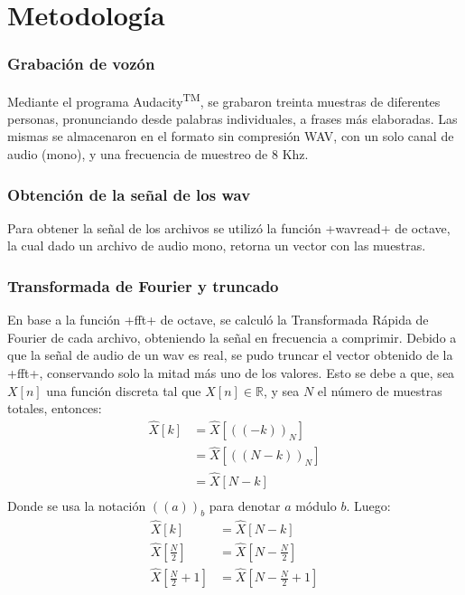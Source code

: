 \documentclass[a4paper,11pt]{article}
\begin{document}
\section{Metodolog\'ia}

\subsubsection{Grabación de voz\'on}
Mediante el programa Audacity\textsuperscript{TM}, se grabaron treinta muestras
de diferentes personas, pronunciando desde palabras individuales, a frases más
elaboradas. Las mismas se almacenaron en el formato sin compresión WAV, con un
solo canal de audio (mono), y una frecuencia de muestreo de $8$ Khz.
\subsubsection{Obtención de la señal de los wav}
Para obtener la señal de los archivos se utilizó la función \verbatim+wavread+ de octave,
la cual dado un archivo de audio mono, retorna un vector con las muestras.
\subsubsection{Transformada de Fourier y truncado}
En base a la función \verbatim+fft+ de octave, se calculó la Transformada Rápida de
Fourier de cada archivo, obteniendo la señal en frecuencia a comprimir.
Debido a que la señal de audio de un wav es real, se pudo truncar el vector
obtenido de la \verbatim+fft+, conservando solo la mitad más uno de los valores. Esto se
debe a que, sea $X[n]$ una función discreta tal que $X[n] \in
\mathbb{R}$, y sea $N$ el número de muestras totales, entonces:
\begin{equation} \label{eq1}
    \begin{split}
        \hat{X}[k] & = \hat{X}[((-k))_N] \\
         & = \hat{X}[((N - k))_N] \\
         & = \hat{X}[N-k] \\
     \end{split}
\end{equation}
Donde se usa la notación $((a))_b$ para denotar $a$ módulo $b$.
Luego:
\begin{equation} \label{eq2}
    \begin{split}
        \hat{X}[k] & = \hat{X}[N-k] \\
        \hat{X}[\frac{N}{2}] & = \hat{X}[N-\frac{N}{2}] \\
        \hat{X}[\frac{N}{2}+1] & = \hat{X}[N-\frac{N}{2}+1] \\
     \end{split}
\end{equation}
\end{document}
